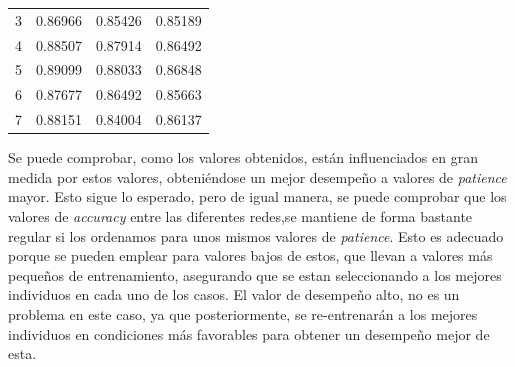 \begin{table}[h]
\begin{tabular}{r|rrr}
3                                & \multicolumn{1}{r|}{0.86966}                                                                                  & \multicolumn{1}{r|}{0.85426}                                                                               & 0.85189                                                                                                  \\
4                                & \multicolumn{1}{r|}{0.88507}                                                                                  & \multicolumn{1}{r|}{0.87914}                                                                               & 0.86492                                                                                                  \\
5                                & \multicolumn{1}{r|}{0.89099}                                                                                  & \multicolumn{1}{r|}{0.88033}                                                                               & 0.86848                                                                                                  \\
6                                & \multicolumn{1}{r|}{0.87677}                                                                                  & \multicolumn{1}{r|}{0.86492}                                                                               & 0.85663                                                                                                  \\
7                                & \multicolumn{1}{r|}{0.88151}                                                                                  & \multicolumn{1}{r|}{0.84004}                                                                               & 0.86137 \\
\bottomrule
\end{tabular}
\end{table}

Se puede comprobar, como los valores obtenidos, están influenciados en gran medida por estos valores, obteniéndose un mejor desempeño a valores de \textit{patience} mayor. Esto sigue lo esperado, pero de igual manera, se puede comprobar que los valores de \textit{accuracy} entre las diferentes redes,se  mantiene de forma bastante regular si los ordenamos para unos mismos valores de \textit{patience}. Esto es adecuado porque se pueden emplear para valores bajos de estos, que llevan a valores más pequeños de entrenamiento, asegurando que se estan seleccionando a los mejores individuos en cada uno de los casos. El valor de desempeño alto, no es un problema en este caso, ya que posteriormente, se re-entrenarán a los mejores individuos en condiciones más favorables para obtener un desempeño mejor de esta.



